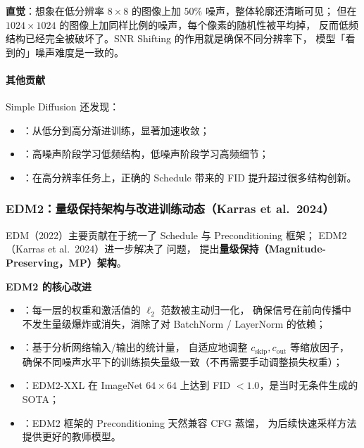 \begin{intubox}
\textbf{直觉}：想象在低分辨率 $8\times8$ 的图像上加 50\% 噪声，整体轮廓还清晰可见；
但在 $1024\times1024$ 的图像上加同样比例的噪声，每个像素的随机性被平均掉，
反而低频结构已经完全被破坏了。SNR Shifting 的作用就是确保不同分辨率下，
模型「看到的」噪声难度是一致的。
\end{intubox}

\paragraph{其他贡献}

Simple Diffusion 还发现：
\begin{itemize}
  \item {}：从低分到高分渐进训练，显著加速收敛；
  \item {}：高噪声阶段学习低频结构，低噪声阶段学习高频细节；
  \item {}：在高分辨率任务上，正确的 Schedule 带来的 FID 提升超过很多结构创新。
\end{itemize}

\subsubsection{EDM2：量级保持架构与改进训练动态（Karras et al.\ 2024）}

EDM（2022）主要贡献在于统一了 Schedule 与 Preconditioning 框架；
EDM2（Karras et al.\ 2024）进一步解决了  问题，
提出\textbf{量级保持（Magnitude-Preserving，MP）架构}。

\begin{conceptbox}
\textbf{EDM2 的核心改进}

\begin{itemize}
  \item {}：每一层的权重和激活值的 $\ell_2$ 范数被主动归一化，
        确保信号在前向传播中不发生量级爆炸或消失，消除了对 BatchNorm / LayerNorm 的依赖；
  \item {}：基于分析网络输入/输出的统计量，
        自适应地调整 $c_\text{skip}, c_\text{out}$ 等缩放因子，
        确保不同噪声水平下的训练损失量级一致（不再需要手动调整损失权重）；
  \item {}：EDM2-XXL 在 ImageNet $64\times64$ 上达到
        FID $< 1.0$，是当时无条件生成的 SOTA；
  \item {}：EDM2 框架的 Preconditioning 天然兼容 CFG 蒸馏，
        为后续快速采样方法提供更好的教师模型。
\end{itemize}
\end{conceptbox}

